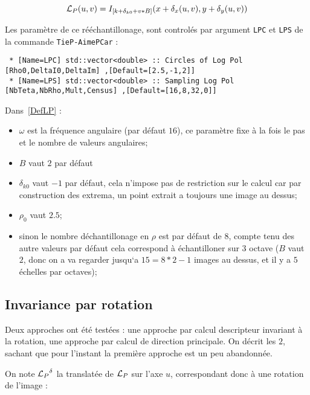 \begin{equation}
     {\mathcal L_P}(u,v) =   I_{[k+\delta_{k0}+v*B]}(x + \delta_x(u,v), y+\delta_y(u,v)) \label{DefLP}
\end{equation}


Les param\`etre de ce r\'e\'echantillonage, sont control\'es par  argument {\tt LPC} et {\tt LPS}
de la commande {\tt TieP-AimePCar} :

\begin{verbatim}
 * [Name=LPC] std::vector<double> :: Circles of Log Pol [Rho0,DeltaI0,DeltaIm] ,[Default=[2.5,-1,2]]
 * [Name=LPS] std::vector<double> :: Sampling Log Pol [NbTeta,NbRho,Mult,Census] ,[Default=[16,8,32,0]]
\end{verbatim}

Dans~\ref{DefLP} :

\begin{itemize}
   \item  $\omega$ est la fr\'equence angulaire (par d\'efaut $16$), ce param\`etre fixe \`a la fois le
          pas et le nombre de valeurs angulaires;
   \item  $B$ vaut $2$ par d\'efaut 
   \item  $\delta_{k0}$ vaut $-1$ par d\'efaut, cela n'impose pas de restriction sur le calcul car
          par construction des extrema, un point extrait a toujours une image au dessus;
   \item  $\rho_0$ vaut $2.5$;
   \item sinon le nombre d\'echantillonage en $\rho$ est par d\'efaut de $8$, compte tenu des autre valeurs
         par d\'efaut cela correspond \`a \'echantilloner sur $3$ octave ($B$ vaut $2$, donc on a 
         va regarder jusqu`a $15=8*2-1$ images au dessus, et il y a $5$ \'echelles par octaves);
\end{itemize}



\subsection{Invariance par rotation}

Deux approches ont \'et\'e test\'ees  : une approche par calcul descripteur
invariant \`a la rotation, une approche par calcul de direction principale.
On d\'ecrit les $2$, sachant que pour l'instant la premi\`ere approche est un
peu abandonn\'ee.

On note ${\mathcal L_P}^\delta$ la translat\'ee de ${\mathcal L_P}$ sur l'axe $u$, correspondant donc \`a une
rotation de l'image :

